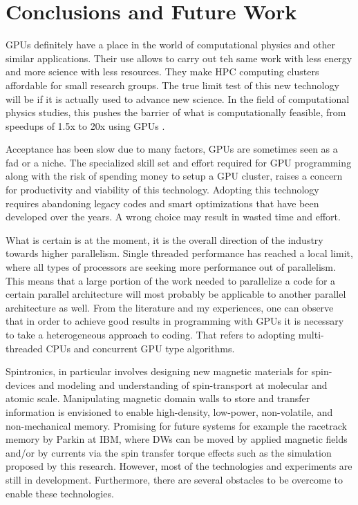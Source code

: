 
\chapter{Conclusions and Future Work} %

\label{Conclusions and Future Work} %


GPUs definitely have a place in the world of computational physics and other similar applications. Their use allows to carry out teh same work with less energy and more science with less resources. They make HPC computing clusters affordable for small research groups. The true limit test of this new technology will be if it is actually used to advance new science. In the field of computational physics studies, this pushes the barrier of what is computationally feasible, from speedups of 1.5x to 20x using GPUs \cite{applications}.

Acceptance has been slow due to many factors, GPUs are sometimes seen as a fad or a niche. The specialized skill set and effort required for GPU programming along with the risk of spending money to setup a GPU cluster, raises a concern for productivity and viability of this technology. Adopting this technology requires abandoning legacy codes and smart optimizations that have been developed over the years. A wrong choice may result in wasted time and effort.

What is certain is at the moment, it is the overall direction of the industry towards higher parallelism. Single threaded performance has reached a local limit, where all types of processors are seeking more performance out of parallelism. This means that a large portion of the work needed to parallelize a code for a certain parallel architecture will most probably be applicable to another parallel architecture as well. From the literature and my experiences, one can observe that in order to achieve good results in programming with GPUs it is necessary to take a heterogeneous approach to coding. That refers to adopting multi-threaded CPUs and concurrent GPU type algorithms.

Spintronics, in particular involves designing new magnetic materials for spin-devices and modeling and understanding of spin-transport at molecular and atomic scale. Manipulating magnetic domain walls to store and transfer information is envisioned to enable high-density, low-power, non-volatile, and non-mechanical memory. Promising for future systems for example the racetrack memory by Parkin at IBM, where DWs can be moved by applied magnetic fields and/or by currents via the spin transfer torque effects such as the simulation proposed by this research. However, most of the technologies and experiments  are still in development. Furthermore, there are several obstacles to be overcome to enable these technologies.

